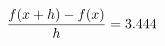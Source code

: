 \documentclass[preview]{standalone}
\begin{document}
\begin{align*}
\special{dvisvgm:raw <g id='unique000'>}\frac{f(x+h)-f(x)}{h} = 3.444\special{dvisvgm:raw </g>}
\end{align*}
\end{document}
